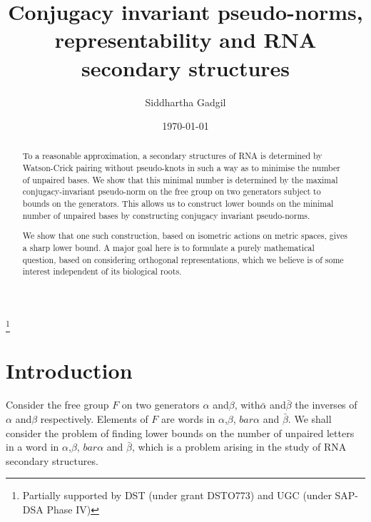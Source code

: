 \documentclass{amsart}
\theoremstyle{plain}
\theoremstyle{definition}
\theoremstyle{remark}
\begin{document}
 

\title[Conjugacy invariant  norms and RNA]{Conjugacy invariant   pseudo-norms, representability and RNA secondary structures}

\author{Siddhartha Gadgil}

\address{	Department of Mathematics\\
		Indian Institute of Science\\
		Bangalore 560003, India}


\thanks{Partially supported by DST (under grant DSTO773) and UGC
(under SAP-DSA Phase IV)}

\date{\today}



\begin{abstract}
To a reasonable approximation, a secondary structures of RNA is determined by Watson-Crick pairing without  pseudo-knots in such a way as to minimise the number of unpaired bases. We show that this minimal number is determined by the maximal conjugacy-invariant pseudo-norm on the free group on two generators subject to bounds on the generators. This allows us to construct lower bounds on the minimal number of unpaired bases by constructing conjugacy invariant   pseudo-norms.

We show that one such construction, based on isometric actions on metric spaces, gives a sharp lower bound. A major goal here is to formulate a purely mathematical question, based on considering orthogonal representations, which we believe is of some interest independent of its biological roots.   

\end{abstract}

\maketitle

\section{Introduction}

Consider the free group $F$ on two generators $\alpha$ and$\beta$, with$\bar{\alpha}$ and$\bar{\beta}$ the inverses of $\alpha$ and$\beta$ respectively. Elements of $F$ are words in $\alpha$,$\beta$, $bar{\alpha}$ and $\bar{\beta}$. We shall consider the problem of finding lower bounds on the number of unpaired letters in a word in $\alpha$,$\beta$, $bar{\alpha}$ and $\bar{\beta}$, which is a problem arising in the study of RNA secondary structures.
\end{document}
